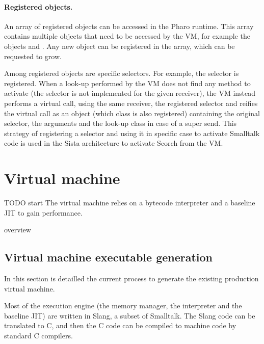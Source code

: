 \documentclass[a4paper,12pt,twoside]{../includes/ThesisStyle}
\begin{document}
\paragraph{Registered objects.} An array of registered objects can be accessed in the Pharo runtime. This array contains multiple objects that need to be accessed by the VM, for example the objects  and . Any new object can be registered in the array, which can be requested to grow. 

Among registered objects are specific selectors. For example, the  selector is registered. When a look-up performed by the VM does not find any method to activate (the selector is not implemented for the given receiver), the VM instead performs a virtual call, using the same receiver, the registered  selector and reifies the virtual call as an object (which class is also registered) containing the original selector, the arguments and the look-up class in case of a super send. This strategy of registering a selector and using it in specific case to activate Smalltalk code is used in the Sista architecture to activate Scorch from the VM.


\section{Virtual machine}

TODO start
The virtual machine relies on a bytecode interpreter and a baseline JIT to gain performance.

overview

\subsection{Virtual machine executable generation}


\cite{Inga97a}

In this section is detailled the current process to generate the existing production virtual machine. 

Most of the execution engine (the memory manager, the interpreter and the baseline JIT) are written in Slang, a subset of Smalltalk. The Slang code can be translated to C, and then the C code can be compiled to machine code by standard C compilers.
\end{document}

